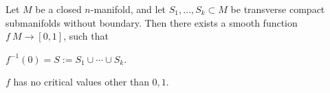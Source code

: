 \begin{lemma}\label{lem:function}
Let $M$ be a closed $n$-manifold,
and let $S_1,\dotsc,S_k\subset M$ be transverse compact submanifolds without boundary.
Then there exists a smooth function $f\:M\to[0,1]$, such that
\begin{enum}
\item $f^{-1}(0)=S:=S_1\cup\cdots\cup S_k$.
\item $f$ has no critical values other than $0,1$.
\end{enum}
\end{lemma}

